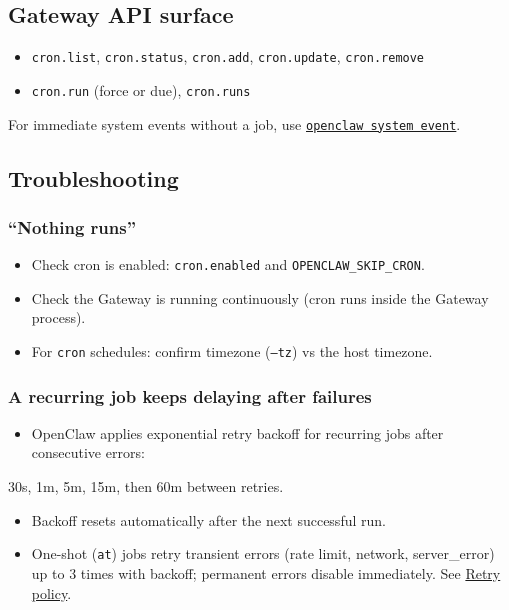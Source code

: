 \subsection{Gateway API surface}


\begin{itemize}
  \item \texttt{cron.list}, \texttt{cron.status}, \texttt{cron.add}, \texttt{cron.update}, \texttt{cron.remove}
  \item \texttt{cron.run} (force or due), \texttt{cron.runs}
\end{itemize}

For immediate system events without a job, use \href{/cli/system}{\texttt{openclaw system event}}.

\subsection{Troubleshooting}


\subsubsection{“Nothing runs”}


\begin{itemize}
  \item Check cron is enabled: \texttt{cron.enabled} and \texttt{OPENCLAW\_SKIP\_CRON}.
  \item Check the Gateway is running continuously (cron runs inside the Gateway process).
  \item For \texttt{cron} schedules: confirm timezone (\texttt{--tz}) vs the host timezone.
\end{itemize}


\subsubsection{A recurring job keeps delaying after failures}


\begin{itemize}
  \item OpenClaw applies exponential retry backoff for recurring jobs after consecutive errors:
\end{itemize}

30s, 1m, 5m, 15m, then 60m between retries.
\begin{itemize}
  \item Backoff resets automatically after the next successful run.
  \item One-shot (\texttt{at}) jobs retry transient errors (rate limit, network, server\_error) up to 3 times with backoff; permanent errors disable immediately. See \href{/automation/cron-jobs\#retry-policy}{Retry policy}.
\end{itemize}


